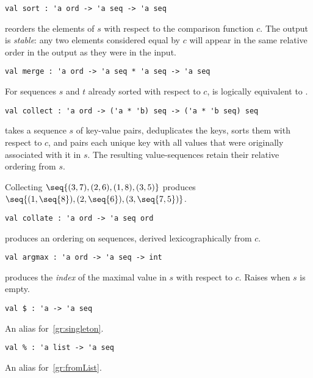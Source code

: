 \begin{gram}[sort]
\label{gr:sort}
\begin{verbatim}
val sort : 'a ord -> 'a seq -> 'a seq
\end{verbatim}
 reorders the elements of $s$ with respect to the comparison
function $c$. The output is \emph{stable}: any two elements considered equal
by $c$ will appear in the same relative order in the output as they were
in the input.
\end{gram}

\begin{gram}[merge]
\label{gr:merge}
\begin{verbatim}
val merge : 'a ord -> 'a seq * 'a seq -> 'a seq
\end{verbatim}
For sequences $s$ and $t$ already sorted with respect to $c$,
 is logically equivalent to .
\end{gram}

\begin{group}
\begin{gram}[collect]
\label{gr:collect}
\begin{verbatim}
val collect : 'a ord -> ('a * 'b) seq -> ('a * 'b seq) seq
\end{verbatim}
 takes a sequence $s$ of key-value pairs, deduplicates the
keys, sorts them with respect to $c$, and pairs each unique key with all values
that were originally associated with it in $s$. The resulting value-sequences
retain their relative ordering from $s$.
\end{gram}
\begin{example}
Collecting $\seq{(3,7),(2,6),(1,8),(3,5)}$ produces
$\seq{(1,\seq{8}), (2, \seq{6}), (3,\seq{7,5})}$.
\end{example}
\end{group}

\begin{gram}[collate]
\label{gr:collate}
\begin{verbatim}
val collate : 'a ord -> 'a seq ord
\end{verbatim}
 produces an ordering on sequences, derived lexicographically
from $c$.
\end{gram}

\begin{gram}[argmax]
\label{gr:argmax}
\begin{verbatim}
val argmax : 'a ord -> 'a seq -> int
\end{verbatim}
 produces the \emph{index} of the maximal value in $s$
with respect to $c$. Raises  when $s$ is empty.
\end{gram}

\begin{gram}[\$]
\begin{verbatim}
val $ : 'a -> 'a seq
\end{verbatim}
An alias for~\ref{gr:singleton}.
\end{gram}

\begin{gram}[\%]
\begin{verbatim}
val % : 'a list -> 'a seq
\end{verbatim}
An alias for~\ref{gr:fromList}.
\end{gram}

